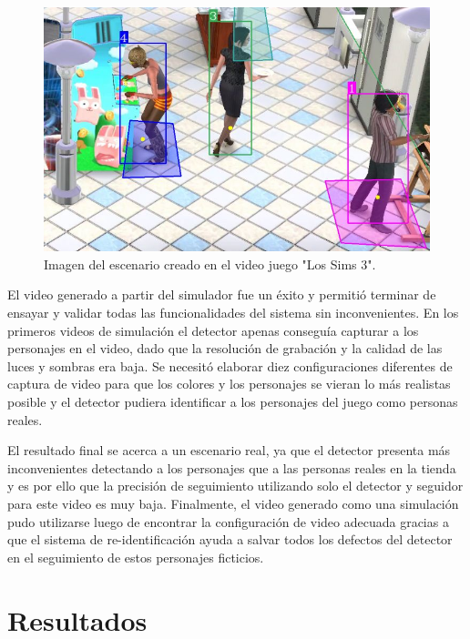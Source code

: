 \begin{figure}[ht]
	\centering
	\includegraphics[scale=.50]{./Figures/sims.jpg}
	\caption{Imagen del escenario creado en el video juego "Los Sims 3".}
	\label{fig:sims}
\end{figure}

\newpage

El video generado a partir del simulador fue un éxito y permitió terminar de ensayar y validar todas las funcionalidades del sistema sin inconvenientes. En los primeros videos de simulación el detector apenas conseguía capturar a los personajes en el video, dado que la resolución de grabación y la calidad de las luces y sombras era baja. Se necesitó elaborar diez configuraciones diferentes de captura de video para que los colores y los personajes se vieran lo más realistas posible y el detector pudiera identificar a los personajes del juego como personas reales.

El resultado final \citep{DEMO:2} se acerca a un escenario real, ya que el detector presenta más inconvenientes detectando a los personajes que a las personas reales en la tienda y es por ello que la precisión de seguimiento utilizando solo el detector y seguidor para este video es muy baja. Finalmente, el video generado como una simulación pudo utilizarse luego de encontrar la configuración de video adecuada gracias a que el sistema de re-identificación ayuda a salvar todos los defectos del detector en el seguimiento de estos personajes ficticios.


\section{Resultados}
\label{sec:resultados}

